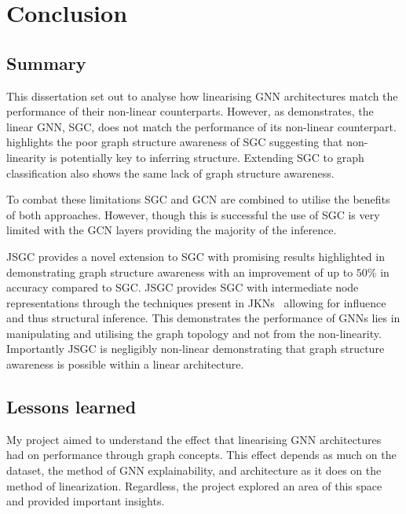 \chapter{Conclusion}

\section{Summary}
This dissertation set out to analyse how linearising GNN architectures match the performance of their non-linear counterparts.
However, as  demonstrates, the linear GNN, SGC, does not match the performance of its non-linear counterpart.
 highlights the poor graph structure awareness of SGC suggesting that non-linearity is potentially key to inferring structure.
Extending SGC to graph classification also shows the same lack of graph structure awareness.

To combat these limitations SGC and GCN are combined to utilise the benefits of both approaches.
However, though this is successful the use of SGC is very limited with the GCN layers providing the majority of the inference.

JSGC provides a novel extension to SGC with promising results highlighted in  demonstrating graph structure awareness with an improvement of up to $50\%$ in accuracy compared to SGC.
JSGC provides SGC with intermediate node representations through the techniques present in JKNs~\cite{xu2018representation} allowing for influence and thus structural inference.
This demonstrates the performance of GNNs lies in manipulating and utilising the graph topology and not from the non-linearity.
Importantly JSGC is negligibly non-linear demonstrating that graph structure awareness is possible within a linear architecture.

\section{Lessons learned}
My project aimed to understand the effect that linearising GNN architectures had on performance through graph concepts.
This effect depends as much on the dataset, the method of GNN explainability, and architecture as it does on the method of linearization.
Regardless, the project explored an area of this space and provided important insights.

